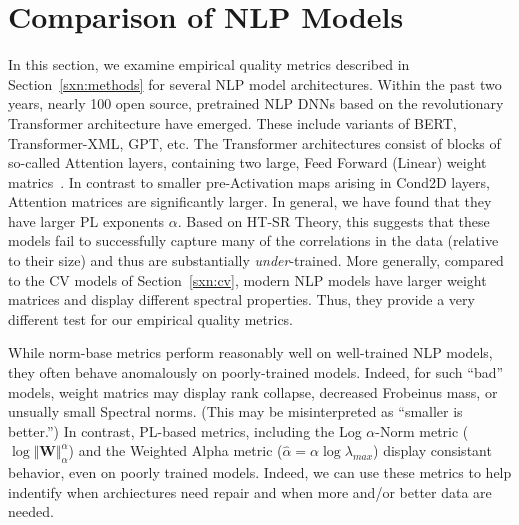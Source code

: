 \section{Comparison of NLP Models}
\label{sxn:nlp}

In this section, we examine empirical quality metrics described in Section~\ref{sxn:methods} for several NLP model architectures.
%
Within the past two years, nearly 100 open source, pretrained NLP DNNs based on the revolutionary Transformer architecture have emerged.
These include variants of BERT, Transformer-XML, GPT, etc.
%
The Transformer architectures consist of blocks of so-called Attention layers, containing two large, Feed Forward (Linear) weight matrics~\cite{Attn2017}. 
In contrast to smaller pre-Activation maps arising in Cond2D layers, Attention matrices are significantly larger.
In general, we have found that they have larger PL exponents $\alpha$.
Based on HT-SR Theory, 
this suggests that these models fail to successfully capture many of the correlations in the data (relative to their size) and thus are substantially \emph{under}-trained.
%
More generally, compared to the CV models of Section~\ref{sxn:cv},
modern NLP models have larger weight matrices and display different spectral properties.
Thus, they provide a very different test for our empirical quality metrics.

While norm-base metrics perform reasonably well on well-trained NLP models, they often behave anomalously on poorly-trained models.
Indeed, for such ``bad'' models, weight matrics may display rank collapse, decreased Frobeinus mass, or unsually small Spectral norms.
(This may be misinterpreted as ``smaller is better.'')
In contrast, PL-based metrics, including the Log $\alpha$-Norm metric ($\log\Vert\mathbf{W}\Vert_{\alpha}^{\alpha}$) and the Weighted Alpha metric ($\hat\alpha =\alpha\log\lambda_{max} $) display consistant behavior, even on poorly trained models.
Indeed, we can use these metrics to help indentify when archiectures need repair and when more and/or better data are needed.


